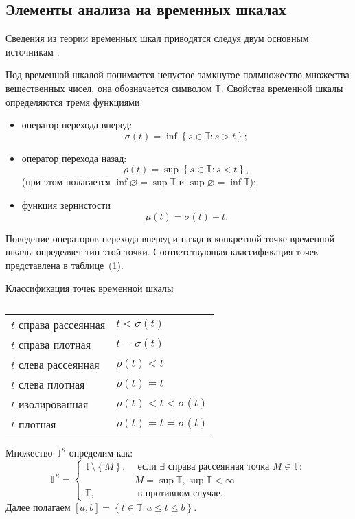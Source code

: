 \subsection{Элементы анализа на временных шкалах}

Сведения из теории временных шкал приводятся следуя двум основным
источникам \cite{Bohner,BohnerAdv}.

\begin{definition}
	Под временной шкалой понимается непустое замкнутое подмножество множества
	вещественных чисел, она обозначается символом $\mathbb{T}$.
	Свойства временной шкалы определяются тремя функциями:
	\begin{itemize}
		\item[1)] оператор перехода вперед:
		\[
		\sigma(t) = \inf\left\{s \in \mathbb{T}: s > t\right\};
		\]
		\item[2)] оператор перехода назад:
		\[
		\rho(t) = \sup\left\{s \in \mathbb{T}: s < t\right\},
		\]
		(при этом полагается $\inf\varnothing = \sup{\mathbb{T}}$ и $\sup\varnothing = \inf{\mathbb{T}}$);
		\item[3)] функция зернистости
		$$\mu(t) = \sigma(t) - t.$$
	\end{itemize}
\end{definition}
Поведение операторов перехода вперед и назад в конкретной точке временной шкалы
определяет тип этой точки. Соответствующая классификация точек представлена в
таблице~(\ref{tab:pointclass}).
\begin{table}[h]

	\centering		
		\caption{}	
		\footnotesize Классификация точек временной шкалы\\
		\normalsize
		\begin{tabular}{|l|l|}
			\hline
			$t$ справа рассеянная & $t < \sigma(t)$ \\
			$t$ справа плотная    & $t = \sigma(t)$ \\
			$t$ слева рассеянная  & $ \rho(t) < t $ \\
			$t$ слева плотная     & $ \rho(t) = t $ \\
			$t$ изолированная      & $\rho(t) < t < \sigma(t)$ \\
			$t$ плотная           & $\rho(t) = t = \sigma(t)$ \\
			\hline
		\end{tabular}
	
	\label{tab:pointclass}
\end{table}

\begin{definition}
	 Множество $\mathbb{T}^\kappa$ определим как:
	 \[
	 \mathbb{T}^\kappa =
	 \begin{cases}
	 \mathbb{T}\setminus \left\{M\right\}, & \text{ если }
	 \exists \text{ справа рассеянная точка } M \in \mathbb{T}:\\
	 & M = \sup\mathbb{T}, \sup\mathbb{T}<\infty  \\
	 \mathbb{T} , & \text{ в противном случае}.
	 \end{cases}
	 \]
	 Далее полагаем $\left[a, b\right] =
	 \left\{t \in \mathbb{T} : a \leqslant t \leqslant b\right\}$.
\end{definition}

